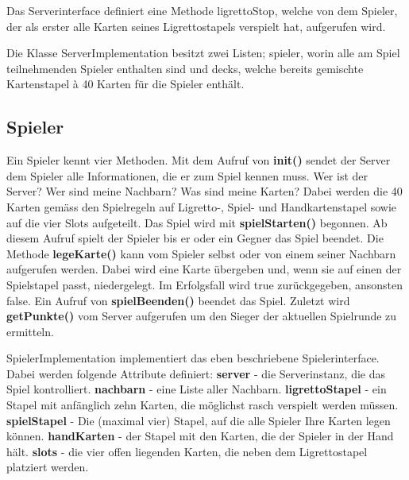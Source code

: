 Das Serverinterface definiert eine Methode ligrettoStop, welche von dem Spieler, der als erster alle Karten seines Ligrettostapels verspielt hat, aufgerufen wird.



Die Klasse ServerImplementation besitzt zwei Listen; spieler, worin alle am Spiel teilnehmenden Spieler enthalten sind und decks, welche bereits gemischte Kartenstapel à 40 Karten für die Spieler enthält.




\subsection{Spieler}

Ein Spieler kennt vier Methoden. Mit dem Aufruf von {\bf init()} sendet der Server dem Spieler alle Informationen, die er zum Spiel kennen muss. Wer ist der Server? Wer sind meine Nachbarn? Was sind meine Karten? Dabei werden die 40 Karten gemäss den Spielregeln auf Ligretto-, Spiel- und Handkartenstapel sowie auf die vier Slots aufgeteilt. Das Spiel wird mit {\bf spielStarten()} begonnen. Ab diesem Aufruf spielt der Spieler bis er oder ein Gegner das Spiel beendet. Die Methode {\bf legeKarte()} kann vom Spieler selbst oder von einem seiner Nachbarn aufgerufen werden. Dabei wird eine Karte übergeben und, wenn sie auf einen der Spielstapel passt, niedergelegt. Im Erfolgsfall wird true zurückgegeben, ansonsten false. Ein Aufruf von {\bf spielBeenden()} beendet das Spiel. Zuletzt wird {\bf getPunkte()} vom Server aufgerufen um den Sieger der aktuellen Spielrunde zu ermitteln.




SpielerImplementation implementiert das eben beschriebene Spielerinterface. Dabei werden folgende Attribute definiert: {\bf server} - die Serverinstanz, die das Spiel kontrolliert. {\bf nachbarn} - eine Liste aller Nachbarn. {\bf ligrettoStapel} - ein Stapel mit anfänglich zehn Karten, die möglichst rasch verspielt werden müssen. {\bf spielStapel} - Die (maximal vier) Stapel, auf die alle Spieler Ihre Karten legen können. {\bf handKarten} - der Stapel mit den Karten, die der Spieler in der Hand hält. {\bf slots} - die vier offen liegenden Karten, die neben dem Ligrettostapel platziert werden.





